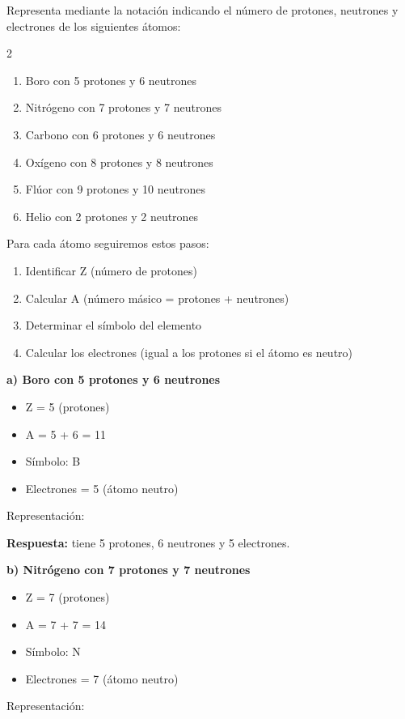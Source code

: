 \begin{exercise}
    Representa mediante la notación  indicando el número de protones, neutrones y electrones de los siguientes átomos:
    \begin{multicols}{2}
        \begin{enumerate}[label=\letraminuscula]
    \item Boro con 5 protones y 6 neutrones
    \item Nitrógeno con 7 protones y 7 neutrones
    \item Carbono con 6 protones y 6 neutrones
    \item Oxígeno con 8 protones y 8 neutrones
    \item Flúor con 9 protones y 10 neutrones
    \item Helio con 2 protones y 2 neutrones
        \end{enumerate}
    \end{multicols}
    \begin{solu}
        Para cada átomo seguiremos estos pasos:
        \begin{enumerate}
            \item Identificar Z (número de protones)
            \item Calcular A (número másico = protones + neutrones)
            \item Determinar el símbolo del elemento
            \item Calcular los electrones (igual a los protones si el átomo es neutro)
        \end{enumerate}

        \textbf{a) Boro con 5 protones y 6 neutrones}
        \begin{itemize}
            \item Z = 5 (protones)
            \item A = 5 + 6 = 11
            \item Símbolo: B
            \item Electrones = 5 (átomo neutro)
        \end{itemize}
        Representación: 

        \textbf{Respuesta:}  tiene 5 protones, 6 neutrones y 5 electrones.

        \textbf{b) Nitrógeno con 7 protones y 7 neutrones}
        \begin{itemize}
            \item Z = 7 (protones)
            \item A = 7 + 7 = 14
            \item Símbolo: N
            \item Electrones = 7 (átomo neutro)
        \end{itemize}
        Representación: 


\end{solu}
\end{exercise}
